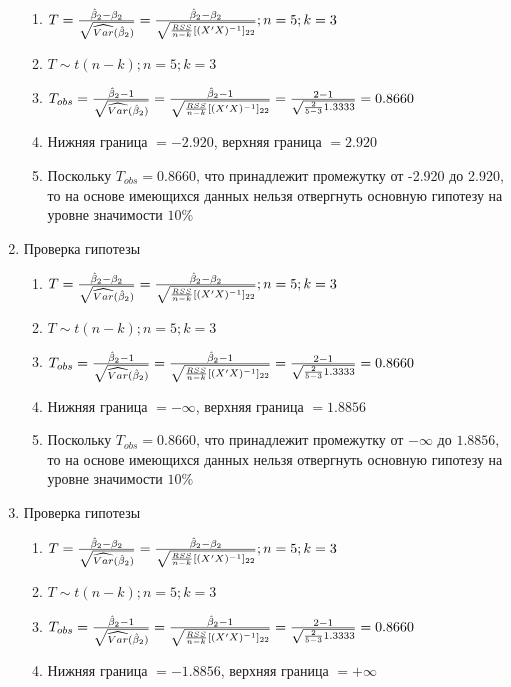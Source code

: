 \begin{solution}
\begin{enumerate}
\begin{enumerate}
\item $T = \frac{\hat{\beta}_2 - \beta_2}{\sqrt{\widehat{Var}(\hat{\beta}_2)}} = \frac {\hat{\beta}_2 - \beta_2}{\sqrt{{\frac{RSS}{n-k}}[(X'X)^{-1}]_{22}}}; n = 5; k = 3$
\item $T \sim t(n-k); n = 5; k = 3$
\item $T_{obs} = \frac{\hat{\beta}_2 - 1}{\sqrt{\widehat{Var}(\hat{\beta}_2)}} = \frac {\hat{\beta}_2 - 1}{\sqrt{{\frac{RSS}{n-k}}[(X'X)^{-1}]_{22}}} = \frac{2-1}{\sqrt{{\frac{2}{5-3}}1.3333}} = 0.8660$
\item Нижняя граница $= -2.920$, верхняя граница $= 2.920$
\item Поскольку $T_{obs} = 0.8660$, что принадлежит промежутку от -2.920 до 2.920, то на основе имеющихся данных нельзя отвергнуть основную гипотезу на уровне значимости $10\%$
\end{enumerate}
\item Проверка гипотезы
\begin{enumerate}
\item $T = \frac{\hat{\beta}_2 - \beta_2}{\sqrt{\widehat{Var}(\hat{\beta}_2)}} = \frac {\hat{\beta}_2 - \beta_2}{\sqrt{{\frac{RSS}{n-k}}[(X'X)^{-1}]_{22}}}; n = 5; k = 3$
\item $T \sim t(n-k); n = 5; k = 3$
\item $T_{obs} = \frac{\hat{\beta}_2 - 1}{\sqrt{\widehat{Var}(\hat{\beta}_2)}} = \frac {\hat{\beta}_2 - 1}{\sqrt{{\frac{RSS}{n-k}}[(X'X)^{-1}]_{22}}} = \frac{2-1}{\sqrt{{\frac{2}{5-3}}1.3333}} = 0.8660$
\item Нижняя граница $= -\infty$, верхняя граница $= 1.8856$
\item Поскольку $T_{obs} = 0.8660$, что принадлежит промежутку от $-\infty$ до $1.8856$, то на основе имеющихся данных нельзя отвергнуть основную гипотезу на уровне значимости $10\%$
\end{enumerate}
\item Проверка гипотезы
\begin{enumerate}
\item $T = \frac{\hat{\beta}_2 - \beta_2}{\sqrt{\widehat{Var}(\hat{\beta}_2)}} = \frac {\hat{\beta}_2 - \beta_2}{\sqrt{{\frac{RSS}{n-k}}[(X'X)^{-1}]_{22}}}; n = 5; k = 3$
\item $T \sim t(n-k); n = 5; k = 3$
\item $T_{obs} = \frac{\hat{\beta}_2 - 1}{\sqrt{\widehat{Var}(\hat{\beta}_2)}} = \frac {\hat{\beta}_2 - 1}{\sqrt{{\frac{RSS}{n-k}}[(X'X)^{-1}]_{22}}} = \frac{2-1}{\sqrt{{\frac{2}{5-3}}1.3333}} = 0.8660$
\item Нижняя граница $= -1.8856$, верхняя граница $= +\infty$

\end{enumerate}
\end{enumerate}
\end{solution}
